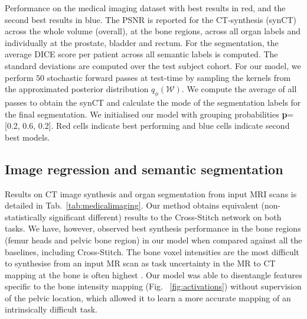 \begin{table}[t!]
\vspace{-3mm}
\caption{\small Performance on the medical imaging dataset with best results in red, and the second best results in blue. The PSNR is reported for the CT-synthesis (synCT) across the whole volume (overall), at the bone regions, across all organ labels and individually at the prostate, bladder and rectum. For the segmentation, the average DICE score per patient across all semantic labels is computed. The standard deviations are computed over the test subject cohort. For our model, we perform $50$ stochastic forward passes at test-time by sampling the kernels from the approximated posterior distribution $q_{\phi}(\mathcal{W})$. We compute the average of all passes to obtain the synCT and calculate the mode of the segmentation labels for the final segmentation. We initialised our model with grouping probabilities \textbf{p}=[0.2, 0.6, 0.2]. Red cells indicate best performing and blue cells indicate second best models.}
\label{tab:medicalimaging}
\end{table}


\subsection{Image regression and semantic segmentation}
Results on CT image synthesis and organ segmentation from input MRI scans is detailed in Tab.~\ref{tab:medicalimaging}. Our method obtains equivalent (non-statistically significant different) results to the Cross-Stitch network \cite{MisraCrossMTL16} on both tasks. We have, however, observed best synthesis performance in the bone regions (femur heads and pelvic bone region) in our model when compared against all the baselines, including Cross-Stitch. The bone voxel intensities are the most difficult to synthesise from an input MR scan as task uncertainty in the MR to CT mapping at the bone is often highest \cite{bragman2018multi}. Our model was able to disentangle features specific to the bone intensity mapping (Fig.~ \ref{fig:activations}) without supervision of the pelvic location, which allowed it to learn a more accurate mapping of an intrinsically difficult task. 


